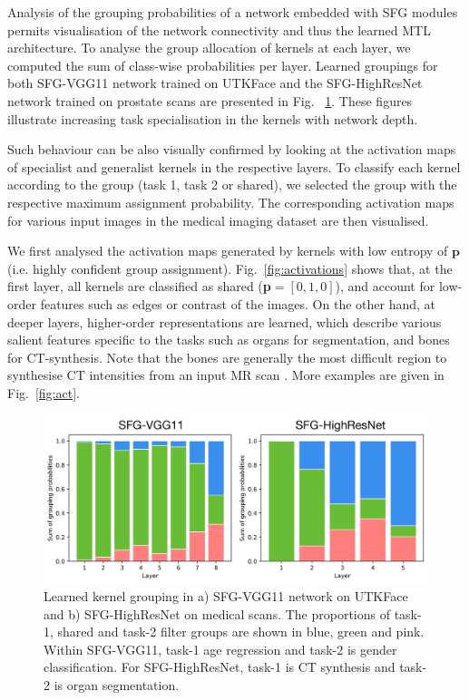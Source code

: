 Analysis of the grouping probabilities of a network embedded with SFG modules permits visualisation of the network connectivity and thus the learned MTL architecture. To analyse the group allocation of kernels at each layer, we computed the sum of class-wise probabilities per layer. Learned groupings for both SFG-VGG11 network trained on UTKFace and the SFG-HighResNet network trained on prostate scans are presented in Fig.~ \ref{fig:LEARNED_A}. These figures illustrate increasing task specialisation in the kernels with network depth. 

Such behaviour can be also visually confirmed by looking at the activation maps of specialist and generalist kernels in the respective layers. To classify each kernel according to the group (task 1, task 2 or shared), we selected the group with the respective maximum assignment probability. The corresponding activation maps for various input images in the medical imaging dataset are then visualised. 

We first analysed the activation maps generated by kernels with low entropy of $\mathbf{p}$ (i.e. highly confident group assignment). Fig.~\ref{fig:activations} shows that, at the first layer, all kernels are classified as shared (\textbf{p}$=[0, 1, 0]$), and account for low-order features such as edges or contrast of the images. On the other hand, at deeper layers, higher-order representations are learned, which describe various salient features specific to the tasks such as organs for segmentation, and bones for CT-synthesis. Note that the bones are generally the most difficult region to synthesise CT intensities from an input MR scan \cite{bragman2018multi}. More examples are given in Fig.~\ref{fig:act}.

\begin{figure}[ht]
	\center
	\includegraphics[width=1.0\linewidth]{chapter_6/figures/learned_a.pdf}
	\caption{\footnotesize Learned kernel grouping in a) SFG-VGG11 network on UTKFace and b) SFG-HighResNet on medical scans. The proportions of task-1, shared and task-2 filter groups are shown in blue, green and pink. Within SFG-VGG11, task-1 age regression and task-2 is gender classification. For SFG-HighResNet, task-1 is CT synthesis and task-2 is organ segmentation. }
    \label{fig:LEARNED_A}
\end{figure}

